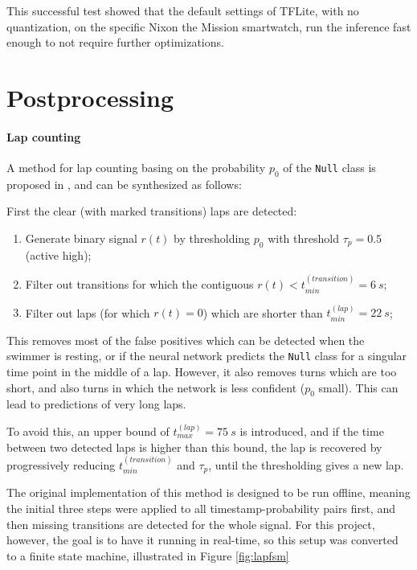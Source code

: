 \documentclass[a4paper, oneside]{discothesis}
\begin{document}
This successful test showed that the default settings of TFLite, with no quantization, on the specific Nixon the Mission smartwatch, run the inference fast enough to not require further optimizations.

\section{Postprocessing}\label{PostProc}

\paragraph{Lap counting}
A method for lap counting basing on the probability $p_0$ of the \texttt{Null} class is proposed in \cite[Ch. 4]{BMSW19}, and can be synthesized as follows:

First the clear (with marked transitions) laps are detected:
\begin{enumerate}
    \item Generate binary signal $r(t)$ by thresholding $p_0$ with threshold $\tau_p=0.5$ (active high);
    \item Filter out transitions for which the contiguous $r(t)<t_{min}^{(transition)}=6~s$;
    \item Filter out laps (for which $r(t)=0$) which are shorter than $t_{min}^{(lap)}=22~s$;
\end{enumerate}
This removes most of the false positives which can be detected when the swimmer is resting, or if the neural network predicts the \texttt{Null} class for a singular time point in the middle of a lap. However, it also removes turns which are too short, and also turns in which the network is less confident ($p_0$ small). This can lead to predictions of very long laps.

To avoid this, an upper bound of $t_{max}^{(lap)}=75~s$ is introduced, and if the time between two detected laps is higher than this bound, the lap is recovered by progressively reducing $t_{min}^{(transition)}$ and $\tau_p$, until the thresholding gives a new lap.

The original implementation of this method is designed to be run offline, meaning the initial three steps were applied to all timestamp-probability pairs first, and then missing transitions are detected for the whole signal. For this project, however, the goal is to have it running in real-time, so this setup was converted to a finite state machine, illustrated in Figure \ref{fig:lapfsm}
\end{document}
